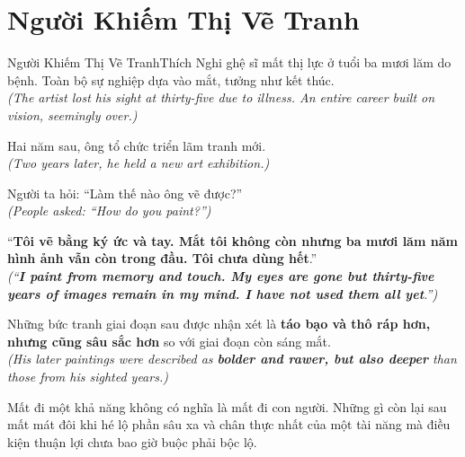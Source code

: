 \section{Người Khiếm Thị Vẽ Tranh}
\begin{truyen}{Người Khiếm Thị Vẽ Tranh}{Thích Nghi}
ghệ sĩ mất thị lực ở tuổi ba mươi lăm do bệnh. Toàn bộ sự nghiệp dựa vào mắt, tưởng như kết thúc.\\
\textit{(The artist lost his sight at thirty-five due to illness. An entire career built on vision, seemingly over.)}

Hai năm sau, ông tổ chức triển lãm tranh mới.\\
\textit{(Two years later, he held a new art exhibition.)}

Người ta hỏi: ``Làm thế nào ông vẽ được?''\\
\textit{(People asked: ``How do you paint?'')}

``\textbf{Tôi vẽ bằng ký ức và tay. Mắt tôi không còn nhưng ba mươi lăm năm hình ảnh vẫn còn trong đầu. Tôi chưa dùng hết}.''\\
\textit{(``\textbf{I paint from memory and touch. My eyes are gone but thirty-five years of images remain in my mind. I have not used them all yet}.'')}

Những bức tranh giai đoạn sau được nhận xét là \textbf{táo bạo và thô ráp hơn, nhưng cũng sâu sắc hơn} so với giai đoạn còn sáng mắt.\\
\textit{(His later paintings were described as \textbf{bolder and rawer, but also deeper} than those from his sighted years.)}
\end{truyen}
\begin{baihoc}
  Mất đi một khả năng không có nghĩa là mất đi con người. Những gì còn lại sau mất mát đôi khi hé lộ phần sâu xa và chân thực nhất của một tài năng mà điều kiện thuận lợi chưa bao giờ buộc phải bộc lộ.
\end{baihoc}

